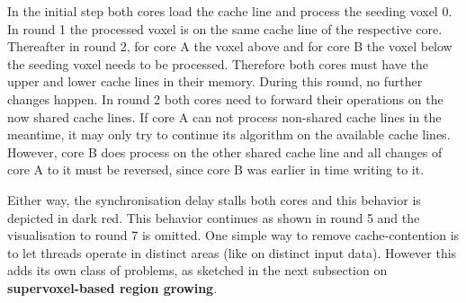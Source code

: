 \documentclass{article}
\begin{document}
In the initial step both cores load the cache line and process the seeding voxel 0.
In round 1 the processed voxel is on the same cache line of the respective core.
Thereafter in round 2, for core A the voxel above and for core B the voxel below the seeding voxel needs to be processed.
Therefore both cores must have the upper and lower cache lines in their memory.
During this round, no further changes happen.
In round 2 both cores need to forward their operations on the now shared cache lines.
If core A can not process non-shared cache lines in the meantime, it may only try to continue its algorithm on the available cache lines.
However, core B does process on the other shared cache line and all changes of core A to it must be reversed, since core B was earlier in time writing to it.\par
Either way, the synchronisation delay stalls both cores and this behavior is depicted in dark red.
This behavior continues as shown in round 5 and the visualisation to round 7 is omitted.
One simple way to remove cache-contention is to let threads operate in distinct areas (like on distinct input data).
However this adds its own class of problems, as sketched in the next subsection on \textbf{supervoxel-based region growing}.
\end{document}
